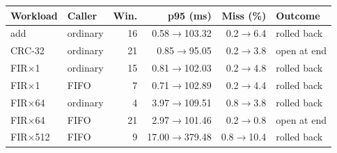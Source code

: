 \begin{tabular}{llrrrl}
\toprule
Workload & Caller & Win. & p95 (ms) & Miss (\%) & Outcome \\
\midrule
add & ordinary & 16 & 0.58$\rightarrow$103.32 & 0.2$\rightarrow$6.4 & rolled back \\
CRC-32 & ordinary & 21 & 0.85$\rightarrow$95.05 & 0.2$\rightarrow$3.8 & open at end \\
FIR$\times$1 & ordinary & 15 & 0.81$\rightarrow$102.03 & 0.2$\rightarrow$4.8 & rolled back \\
FIR$\times$1 & FIFO & 7 & 0.71$\rightarrow$102.89 & 0.2$\rightarrow$4.4 & rolled back \\
FIR$\times$64 & ordinary & 4 & 3.97$\rightarrow$109.51 & 0.8$\rightarrow$3.8 & rolled back \\
FIR$\times$64 & FIFO & 21 & 2.97$\rightarrow$101.46 & 0.2$\rightarrow$0.8 & open at end \\
FIR$\times$512 & FIFO & 9 & 17.00$\rightarrow$379.48 & 0.8$\rightarrow$10.4 & rolled back \\
\bottomrule
\end{tabular}
